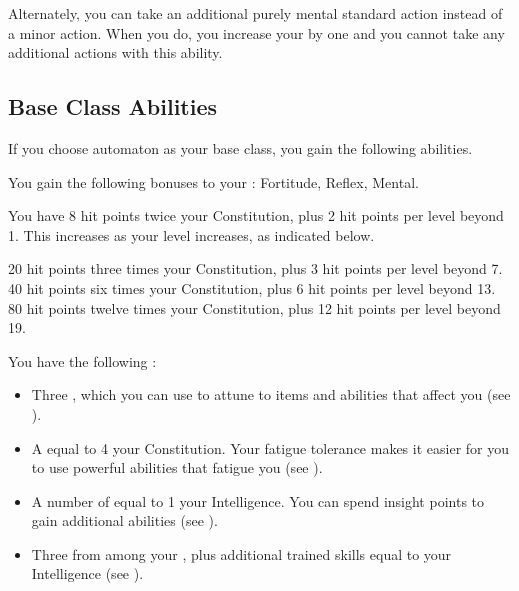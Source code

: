        Alternately, you can take an additional purely mental standard action instead of a minor action.
        When you do, you increase your  by one and you  cannot take any additional actions with this ability.

    \subsection{Base Class Abilities}
        If you choose automaton as your base class, you gain the following abilities.

        You gain the following bonuses to your :  Fortitude,  Reflex,  Mental.

            You have 8 hit points \add twice your Constitution, plus 2 hit points per level beyond 1.
            This increases as your level increases, as indicated below.
            \begin{itemize}
                 20 hit points \add three times your Constitution, plus 3 hit points per level beyond 7.
                 40 hit points \add six times your Constitution, plus 6 hit points per level beyond 13.
                 80 hit points \add twelve times your Constitution, plus 12 hit points per level beyond 19.
            \end{itemize}

         You have the following :
        \begin{itemize}
            \item Three , which you can use to attune to items and abilities that affect you (see ).
            \item A  equal to 4 \add your Constitution.
                Your fatigue tolerance makes it easier for you to use powerful abilities that fatigue you (see ).
            \item A number of  equal to 1 \add your Intelligence.
                You can spend insight points to gain additional abilities (see ).
            \item Three  from among your , plus additional trained skills equal to your Intelligence (see ).
        \end{itemize}

